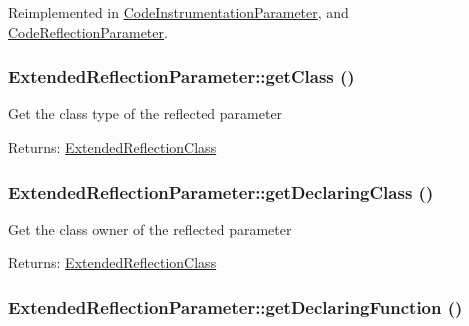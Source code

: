 Reimplemented in \hyperlink{class_code_instrumentation_parameter_e0c68e69aa93979e2e1fa3057bd39d5a}{CodeInstrumentationParameter}, and \hyperlink{class_code_reflection_parameter_04d7dbd71bc943f3e267869a79bec648}{CodeReflectionParameter}.\hypertarget{class_extended_reflection_parameter_9aaaf60b00d1c1cde3c86cda51402461}{
\subsubsection[{getClass}]{\setlength{\rightskip}{0pt plus 5cm}ExtendedReflectionParameter::getClass ()}}
\label{class_extended_reflection_parameter_9aaaf60b00d1c1cde3c86cda51402461}


Get the class type of the reflected parameter

\begin{Desc}
\item[Returns:]\hyperlink{class_extended_reflection_class}{ExtendedReflectionClass} \end{Desc}
\hypertarget{class_extended_reflection_parameter_72292163fccd8a81a83af04f371e795a}{
\subsubsection[{getDeclaringClass}]{\setlength{\rightskip}{0pt plus 5cm}ExtendedReflectionParameter::getDeclaringClass ()}}
\label{class_extended_reflection_parameter_72292163fccd8a81a83af04f371e795a}


Get the class owner of the reflected parameter

\begin{Desc}
\item[Returns:]\hyperlink{class_extended_reflection_class}{ExtendedReflectionClass} \end{Desc}
\hypertarget{class_extended_reflection_parameter_0bc8d76223b0770a40a3ab909cc5b3f0}{
\subsubsection[{getDeclaringFunction}]{\setlength{\rightskip}{0pt plus 5cm}ExtendedReflectionParameter::getDeclaringFunction ()}}
\label{class_extended_reflection_parameter_0bc8d76223b0770a40a3ab909cc5b3f0}



